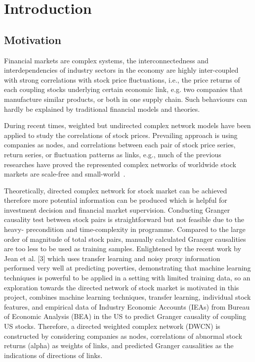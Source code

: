 \chapter{Introduction}
\section{Motivation}
Financial markets are complex systems, the interconnectedness and interdependencies of industry sectors in the economy are highly inter-coupled with strong correlations with stock price fluctuations, i.e., the price returns of each coupling stocks underlying certain economic link, e.g. two companies that manufacture similar products, or both in one supply chain. Such behaviours can hardly be explained by traditional financial models and theories.

During recent times, weighted but undirected complex network models have been applied to study the correlations of stock prices. Prevailing approach is using companies as nodes, and correlations between each pair of stock price series, return series, or fluctuation patterns as links, e.g., much of the previous researches have proved the represented complex networks of worldwide stock markets are scale-free and small-world~\cite{cnsm, perspective}.

Theoretically, directed complex network for stock market can be achieved therefore more potential information can be produced which is helpful for investment decision and financial market supervision. Conducting Granger causality test between stock pairs is straightforward but not feasible due to the heavy- precondition and time-complexity in programme. Compared to the large order of magnitude of total stock pairs, manually calculated Granger causalities are too less to be used as training samples. Enlightened by the recent work by Jean et al. [3] which uses transfer learning and noisy proxy information performed very well at predicting poverties, demonstrating that machine learning techniques is powerful to be applied in a setting with limited training data, so an exploration towards the directed network of stock market is motivated in this project, combines machine learning techniques, transfer learning, individual stock features, and empirical data of Industry Economic Accounts (IEAs) from Bureau of Economic Analysis (BEA) in the US to predict Granger causality of coupling US stocks. Therefore, a directed weighted complex network (DWCN) is constructed by considering companies as nodes, correlations of abnormal stock returns (alpha) as weights of links, and predicted Granger causalities as the indications of directions of links.

